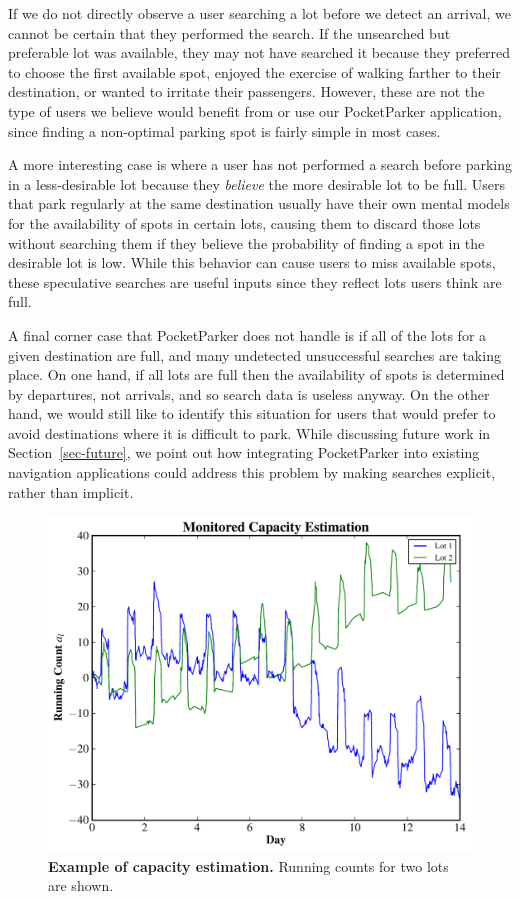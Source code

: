 If we do not directly observe a user searching a lot before we detect an
arrival, we cannot be certain that they performed the search. If the
unsearched but preferable lot was available, they may not have searched it
because they preferred to choose the first available spot, enjoyed the
exercise of walking farther to their destination, or wanted to irritate
their passengers. However, these are not the type of users we believe
would benefit from or use our PocketParker application, since finding a
non-optimal parking spot is fairly simple in most cases.

A more interesting case is where a user has not performed a search before
parking in a less-desirable lot because they \textit{believe} the more
desirable lot to be full. Users that park regularly at the same destination
usually have their own mental models for the availability of spots in certain
lots, causing them to discard those lots without searching them if they
believe the probability of finding a spot in the desirable lot is low. While
this behavior can cause users to miss available spots, these speculative
searches are useful inputs since they reflect lots users think are full.

A final corner case that PocketParker does not handle is if all of the lots
for a given destination are full, and many undetected unsuccessful searches
are taking place. On one hand, if all lots are full then the availability of
spots is determined by departures, not arrivals, and so search data is
useless anyway. On the other hand, we would still like to identify this
situation for users that would prefer to avoid destinations where it is
difficult to park. While discussing future work in Section~\ref{sec-future},
we point out how integrating PocketParker into existing navigation
applications could address this problem by making searches explicit, rather
than implicit.

\begin{figure}
\centering
\includegraphics[width=\columnwidth]{./simulator/figures/capacity.pdf}

\caption{\textbf{Example of capacity estimation.} Running counts for two lots
are shown.}

\label{fig-capacityexample}
\end{figure}

